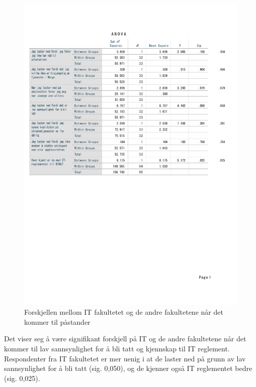 \begin{figure}[H]
    \centering
    \includegraphics[scale=0.7]{case_1/bilder/fakultet_pastander_anova.pdf}
    \caption{Forskjellen mellom IT fakultetet og de andre fakultetene når det kommer til påstander}
    \label{fig:fakultet_pastander_anova}
\end{figure}

Det viser seg å være signifikant forskjell på IT og de andre fakultetene når det kommer til lav sannsynlighet for å bli tatt og kjennskap til IT reglement. Respondenter fra IT fakultetet er mer uenig i at de laster ned på grunn av lav sannsynlighet for å bli tatt (sig. 0,050), og de kjenner også IT reglementet bedre (sig. 0,025). 

